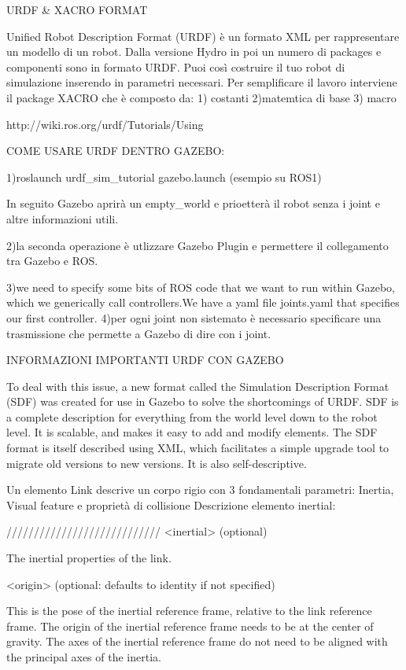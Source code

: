 URDF & XACRO FORMAT

Unified Robot Description Format (URDF) è un formato XML per rappresentare un modello di un robot.
Dalla versione Hydro in poi un numero di packages e componenti sono in formato URDF.
Puoi così costruire il tuo robot di simulazione inserendo in parametri necessari.
Per semplificare il lavoro interviene il package XACRO che  è composto da:
1) costanti
2)matemtica di base
3) macro

http://wiki.ros.org/urdf/Tutorials/Using%

COME USARE URDF DENTRO GAZEBO:

1)roslaunch urdf_sim_tutorial gazebo.launch (esempio su ROS1)
 
In seguito Gazebo aprirà un empty_world e prioetterà il robot senza i joint e altre informazioni utili.

2)la seconda operazione è utlizzare Gazebo Plugin e permettere il collegamento tra Gazebo e ROS.

3)we need to specify some bits of ROS code that we want to run within Gazebo, which we generically call controllers.We have a yaml file joints.yaml that specifies our first controller.
4)per ogni joint non sistemato è necessario specificare una trasmissione che permette a Gazebo di dire con i joint.

INFORMAZIONI IMPORTANTI URDF CON GAZEBO

To deal with this issue, a new format called the Simulation Description Format (SDF) was created for use in Gazebo to solve the shortcomings of URDF. SDF is a complete description for everything from the world level down to the robot level. It is scalable, and makes it easy to add and modify elements. The SDF format is itself described using XML, which facilitates a simple upgrade tool to migrate old versions to new versions. It is also self-descriptive.

Un elemento Link descrive un corpo rigio con 3 fondamentali parametri: Inertia, Visual feature e proprietà di collisione
Descrizione elemento inertial:

////////////////////////////
<inertial> (optional)

    The inertial properties of the link.

    <origin> (optional: defaults to identity if not specified)

        This is the pose of the inertial reference frame, relative to the link reference frame. The origin of the inertial reference frame needs to be at the center of gravity. The axes of the inertial reference frame do not need to be aligned with the principal axes of the inertia.

